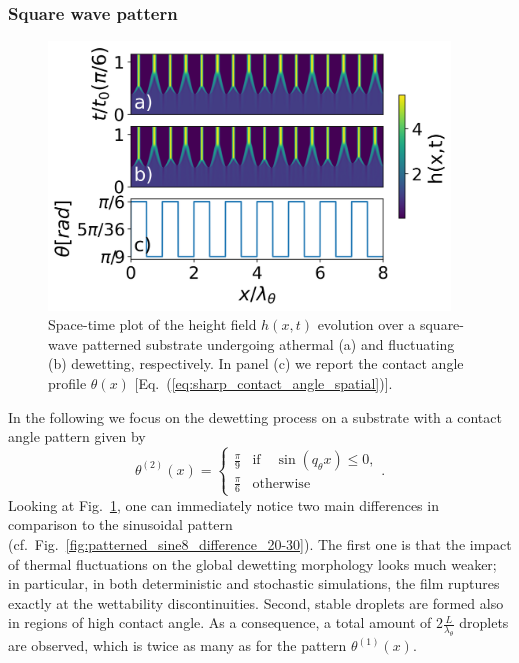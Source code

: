 \subsubsection{Square wave pattern}\label{subsubsec:square_wave}
\begin{figure}
    \centering
    \includegraphics[width=0.95\textwidth]{graphics/spacedepCA_['delta', '1e7', '10', 25, '9_3', 2000000.0]_v2.png}
    \caption{Space-time plot of the height field $h(x,t)$ evolution over a square-wave patterned substrate undergoing athermal (a) and fluctuating (b) dewetting, respectively. 
    In panel (c) we report the contact angle profile $\theta(x)$ [Eq.~(\ref{eq:sharp_contact_angle_spatial})].} 
    \label{fig:patterned_step8_difference_20-30}
\end{figure}
In the following we focus on the dewetting process on a substrate with a contact angle pattern given by 
\begin{equation}\label{eq:sharp_contact_angle_spatial}
    {\theta^{(2)}(x)} = 
    \left\{
    \begin{array}{ll}
        \frac{\pi}{9} & \text{if} \quad\sin(q_{\theta}x) \leq 0, \\
        \frac{\pi}{6} & \text{otherwise}
    \end{array}
    \right..
\end{equation}
Looking at Fig.~\ref{fig:patterned_step8_difference_20-30}, one can immediately notice two main differences in comparison to the sinusoidal pattern (cf.~Fig.~\ref{fig:patterned_sine8_difference_20-30}). 
The first one is that the impact of thermal fluctuations on the global dewetting morphology looks much weaker; in particular, in both deterministic and stochastic simulations, the film ruptures exactly at the wettability discontinuities.
Second, stable droplets are formed also in regions of high contact angle. 
As a consequence, a total amount of $2\frac{L}{\lambda_{\theta}}$ droplets are observed, which is twice as many as for the pattern $\theta^{(1)}(x)$.

